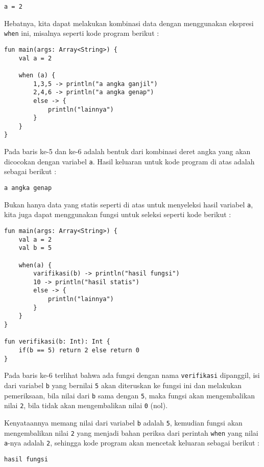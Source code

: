 \begin{lstlisting}
a = 2
\end{lstlisting}

Hebatnya, kita dapat melakukan kombinasi data dengan menggunakan ekspresi \texttt{when} ini, misalnya seperti kode program berikut :

\begin{lstlisting}
fun main(args: Array<String>) {
	val a = 2
	
	when (a) {
		1,3,5 -> println("a angka ganjil")
		2,4,6 -> println("a angka genap")
		else -> {
			println("lainnya")
		}
	}
}
\end{lstlisting}

Pada baris ke-5 dan ke-6 adalah bentuk dari kombinasi deret angka yang akan dicocokan dengan variabel \texttt{a}. Hasil keluaran untuk kode program di atas adalah sebagai berikut :

\begin{lstlisting}
a angka genap
\end{lstlisting}

Bukan hanya data yang statis seperti di atas untuk menyeleksi hasil variabel \texttt{a}, kita juga dapat menggunakan fungsi untuk seleksi seperti kode berikut :

\begin{lstlisting}
fun main(args: Array<String>) {
	val a = 2
	val b = 5
	
	when(a) {
		varifikasi(b) -> println("hasil fungsi")
		10 -> println("hasil statis")
		else -> {
			println("lainnya")
		}
	}
}

fun verifikasi(b: Int): Int {
	if(b == 5) return 2 else return 0
}
\end{lstlisting}

Pada baris ke-6 terlihat bahwa ada fungsi dengan nama \texttt{verifikasi} dipanggil, isi dari variabel \texttt{b} yang bernilai \texttt{5} akan diteruskan ke fungsi ini dan melakukan pemeriksaan, bila nilai dari \texttt{b} sama dengan \texttt{5}, maka fungsi akan mengembalikan nilai \texttt{2}, bila tidak akan mengembalikan nilai \texttt{0} (nol).

Kenyataannya memang nilai dari variabel \texttt{b} adalah \texttt{5}, kemudian fungsi akan mengembalikan nilai \texttt{2} yang menjadi bahan periksa dari perintah \texttt{when} yang nilai \texttt{a}-nya adalah \texttt{2}, sehingga kode program akan mencetak keluaran sebagai berikut :

\begin{lstlisting}
hasil fungsi
\end{lstlisting}

